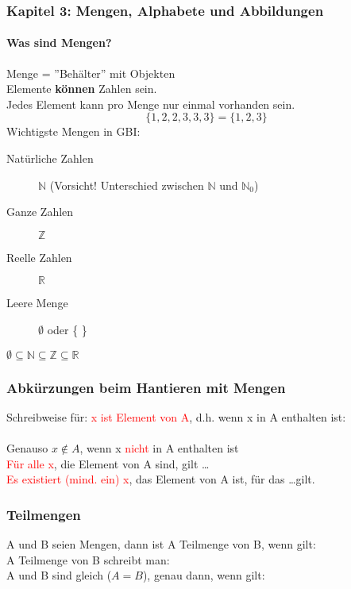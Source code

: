\documentclass{beamer}
\begin{document}
	\begin{frame}
		\frametitle{Kapitel 3: Mengen, Alphabete und Abbildungen}
		\framesubtitle{Was sind Mengen?}
		Menge = ''Behälter'' mit Objekten\\
		Elemente \textbf{können} Zahlen sein.\\
		Jedes Element kann pro Menge nur einmal vorhanden sein.\\
		\begin{equation*}
			\lbrace 1, 2, 2, 3, 3, 3\rbrace = \lbrace 1, 2, 3\rbrace
		\end{equation*}
		Wichtigste Mengen in GBI:\\
		\begin{description}
			\item[Natürliche Zahlen] $\mathbb{N}$ (Vorsicht! Unterschied zwischen $\mathbb{N}$ und $\mathbb{N}_0$)
			\item[Ganze Zahlen] $\mathbb{Z}$
			\item[Reelle Zahlen] $\mathbb{R}$
			\item[Leere Menge] $\emptyset$ oder \{   \}
		\end{description}
		$\emptyset\subseteq\mathbb{N}\subseteq\mathbb{Z}\subseteq\mathbb{R}$
	\end{frame}
	\begin{frame}
		\frametitle{Abkürzungen beim Hantieren mit Mengen}
		Schreibweise für: \textcolor{red}{x ist Element von A}, d.h. wenn x in A enthalten ist:\\
		\\
		Genauso $x \notin A$, wenn x \textcolor{red}{nicht} in A enthalten ist\\
		\textcolor{red}{Für alle x}, die Element von A sind, gilt \dots\\
		\textcolor{red}{Es existiert (mind. ein) x}, das Element von A ist, für das \dots gilt.
	\end{frame}
	\begin{frame}
		\frametitle{Teilmengen}
		A und B seien Mengen, dann ist A Teilmenge von B, wenn gilt:
		\center{$\forall x\in A: x\in B$}\\
		A Teilmenge von B schreibt man:
		\center{$A\subseteq B$}\\
		A und B sind gleich ($A = B$), genau dann, wenn gilt:
		\center{$A\subseteq B$ und $B\subseteq A$}
	\end{frame}
\end{document}
